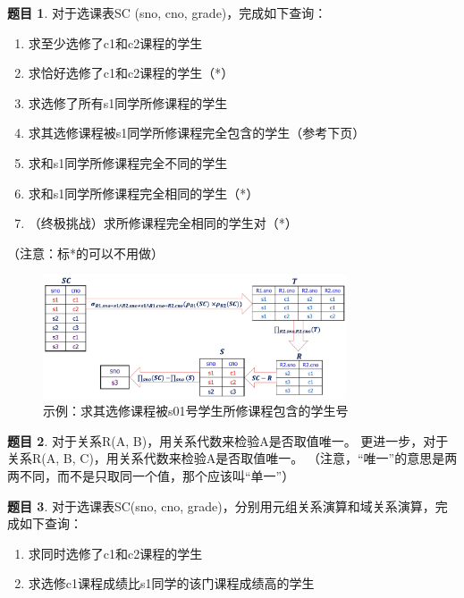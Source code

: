 \documentclass[12pt]{article} %
\makeatletter
\theoremstyle{definition}
\newtheorem{problem}{题目}
\newenvironment{proof}[1][\protect\proofname]{\par
\normalfont\topsep6\p@\@plus6\p@\relax
\trivlist
\itemindent\parindent
\item[\hskip\labelsep
\scshape
#1]\ignorespaces
}{%
\endtrivlist\@endpefalse
}
\renewcommand{\proofname}{\it{解答}}
\makeatother
\begin{document}
\begin{proof}

\end{proof}

\begin{problem}
对于选课表SC (sno, cno, grade)，完成如下查询：

\begin{enumerate}
  \item 求至少选修了c1和c2课程的学生
  \item 求恰好选修了c1和c2课程的学生（*）
  \item 求选修了所有s1同学所修课程的学生
  \item 求其选修课程被s1同学所修课程完全包含的学生（参考下页）
  \item 求和s1同学所修课程完全不同的学生
  \item 求和s1同学所修课程完全相同的学生（*）
  \item （终极挑战）求所修课程完全相同的学生对（*）
\end{enumerate}

（注意：标*的可以不用做）

\begin{figure}[H]
  \centering
  \includegraphics[width=0.8\textwidth]{./figs/2.1.png}
  \caption{示例：求其选修课程被s01号学生所修课程包含的学生号}
\end{figure}

\end{problem}  

\begin{proof}

\end{proof}

\begin{problem}
对于关系R(A, B)，用关系代数来检验A是否取值唯一。
更进一步，对于关系R(A, B, C)，用关系代数来检验A是否取值唯一。
（注意，“唯一”的意思是两两不同，而不是只取同一个值，那个应该叫“单一”）  
\end{problem}

\begin{proof}

\end{proof}

\begin{problem}
对于选课表SC(sno, cno, grade)，分别用元组关系演算和域关系演算，完成如下查询：

\begin{enumerate}
  \item 求同时选修了c1和c2课程的学生
  \item 求选修c1课程成绩比s1同学的该门课程成绩高的学生
\end{enumerate}  
  
\end{problem}

\begin{proof}

\end{proof}

\newpage


\end{document}
